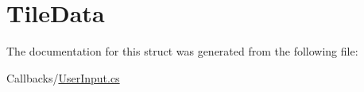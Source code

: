 \hypertarget{structOTA_1_1Callbacks_1_1TileData}{}\section{Tile\+Data}
\label{structOTA_1_1Callbacks_1_1TileData}


The documentation for this struct was generated from the following file\+:\begin{DoxyCompactItemize}
\item 
Callbacks/\hyperlink{UserInput_8cs}{User\+Input.\+cs}\end{DoxyCompactItemize}
